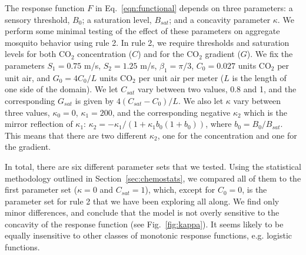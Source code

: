 \documentclass[12pt]{article}
\newif\ifcommentsw
\newcommand{\comment}[1]{\ifcommentsw  $\blacktriangleright$\ \textbf{#1}\ $\blacktriangleleft$ \fi}
\begin{document}
The response function $F$ in Eq.~\ref{eqn:functional} depends on three parameters: a sensory threshold, $B_0$; a saturation level, $B_{sat}$; and a concavity parameter $\kappa$. We perform some minimal testing of the effect of these parameters on aggregate mosquito behavior using rule 2. In rule 2, we require thresholds and saturation levels for both CO$_2$ concentration ($C$) and for the CO$_2$ gradient ($G$). We fix the parameters $S_1 =  0.75$ m/s, $ S_2 = 1.25$ m/s, $ \beta_1 = \pi/3$, $C_0 = 0.027$ units CO$_2$ per unit air, and $G_0 = 4C_0/L$ units CO$_2$ per unit air per meter ($L$ is the length of one side of the domain). We let $C_{sat}$ vary between two values, 0.8 and 1, and the corresponding $G_{sat}$ is given by $4(C_{sat} - C_0) / L$. We also let $\kappa$ vary between three values, $\kappa_0 = 0$, $\kappa_1 = 200$, and the corresponding negative $\kappa_2$ which is the mirror reflection of $\kappa_1$: $\kappa_2 = -\kappa_1/(1 + \kappa_1 b_0 (1+b_0))$, where $b_0 = B_0/B_{sat}$. This means that there are two different $\kappa_2$, one for the concentration and one for the gradient. 

In total, there are six different parameter sets that we tested. Using the statistical methodology outlined in Section~\ref{sec:chemostats}, we compared all of them to the first parameter set ($\kappa = 0$ and $C_{sat} = 1$), which, except for $C_0 = 0$, is the parameter set for rule 2 that we have been exploring all along. We find only minor differences, and conclude that the model is not overly sensitive to the concavity of the response function (see Fig.~\ref{fig:kappa}). It seems likely to be equally insensitive to other classes of monotonic response functions, e.g. logistic functions. \comment{Bree: For completeness, I should look at the comparisons wrt the empirical distributions generated by the other rule sets. Empirical distributions 3 and 6 are farther from the others.}
\end{document}
